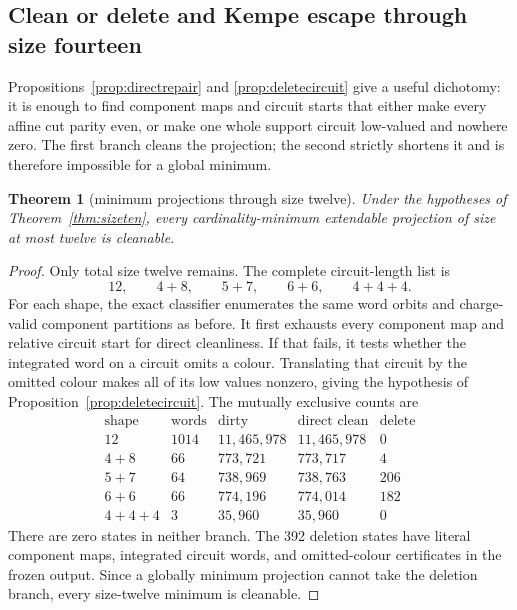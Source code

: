 \documentclass[11pt]{article}
\newtheorem{theorem}{Theorem}[section]
\theoremstyle{definition}
\theoremstyle{remark}
\begin{document}
\subsection{Clean or delete and Kempe escape through size fourteen}

Propositions~\ref{prop:directrepair} and
\ref{prop:deletecircuit} give a useful dichotomy: it is enough to find
component maps and circuit starts that either make every affine cut parity
even, or make one whole support circuit low-valued and nowhere zero.  The
first branch cleans the projection; the second strictly shortens it and is
therefore impossible for a global minimum.

\begin{theorem}[minimum projections through size twelve]
\label{thm:sizetwelve}
Under the hypotheses of Theorem~\ref{thm:sizeten}, every
cardinality-minimum extendable projection of size at most twelve is
cleanable.
\end{theorem}

\begin{proof}
Only total size twelve remains.  The complete circuit-length list is
\[
                12,\qquad4+8,\qquad5+7,\qquad6+6,\qquad4+4+4. \tag{17}
\]
For each shape, the exact classifier enumerates the same word orbits and
charge-valid component partitions as before.  It first exhausts every
component map and relative circuit start for direct cleanliness.  If that
fails, it tests whether the integrated word on a circuit omits a colour.
Translating that circuit by the omitted colour makes all of its low values
nonzero, giving the hypothesis of
Proposition~\ref{prop:deletecircuit}.  The mutually exclusive counts are
\[
\begin{array}{c|r|r|r|r}
\text{shape}&\text{words}&\text{dirty}&\text{direct clean}&
\text{delete}\\
\hline
12&1014&11{,}465{,}978&11{,}465{,}978&0\\
4+8&66&773{,}721&773{,}717&4\\
5+7&64&738{,}969&738{,}763&206\\
6+6&66&774{,}196&774{,}014&182\\
4+4+4&3&35{,}960&35{,}960&0
\end{array}
\]
There are zero states in neither branch.  The 392 deletion states have
literal component maps, integrated circuit words, and omitted-colour
certificates in the frozen output.  Since a globally minimum projection
cannot take the deletion branch, every size-twelve minimum is cleanable.
\end{proof}
\end{document}
